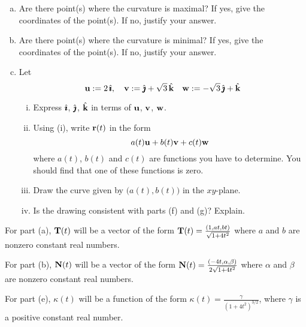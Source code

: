 \begin{question}[M317 2016A]
\begin{enumerate}[(a)]
\item
Are there point(s) where the curvature is maximal? If yes, give the 
coordinates of the point(s). If no, justify your answer.

\item
Are there point(s) where the curvature is minimal? If yes, give 
the coordinates of the point(s). If no, justify your answer.

\item
Let 
\begin{equation*}
\mathbf{u} := 2\,\hat{\pmb{\imath}},\quad 
\mathbf{v} := \hat{\pmb{\jmath}} + \sqrt{3}\,\hat{\mathbf{k}}\quad
\mathbf{w} := -\sqrt{3}\,\hat{\pmb{\jmath}} + \hat{\mathbf{k}}
\end{equation*}
   \begin{enumerate}[(i)] 
      \item
      Express $\hat{\pmb{\imath}}$, $\hat{\pmb{\jmath}}$, $\hat{\mathbf{k}}$ in terms of $\mathbf{u}$, $\mathbf{v}$, $\mathbf{w}$.
      \item
      Using (i), write $\mathbf{r}(t)$ in the form
      \begin{equation*}
                a(t)\mathbf{u} + b(t)\mathbf{v} + c(t)\mathbf{w}
      \end{equation*}
       where $a(t)$, $b(t)$ and $c(t)$ are functions you have to determine. 
       You should find that one of these functions is zero.
     \item
      Draw the curve given by $\big(a(t), b(t)\big)$ in the $xy$-plane.
     \item 
     Is the drawing consistent with parts (f) and (g)? Explain.
     \end{enumerate}
\end{enumerate}
\end{question}

\begin{hint} 
For part (a), $\mathbf{T}(t)$ will be a vector of the form 
$\mathbf{T}(t) = \frac{(1,at,bt)}{\sqrt{1+4t^2}}$
where $a$ and $b$ are nonzero constant real numbers.

For part (b), $\mathbf{N}(t)$ will be a vector of the form 
$\mathbf{N}(t) = \frac{(-4t,\alpha, \beta)}{2\sqrt{1+4t^2}}$
where $\alpha$ and $\beta$ are nonzero constant real numbers.

For part (e),  $\kappa(t)$ will be a function of the form 
 $\kappa(t) = \frac{\gamma}{{(1+4t^2)}^{3/2}}$, where $\gamma$ is 
a positive constant real number.

\end{hint}

